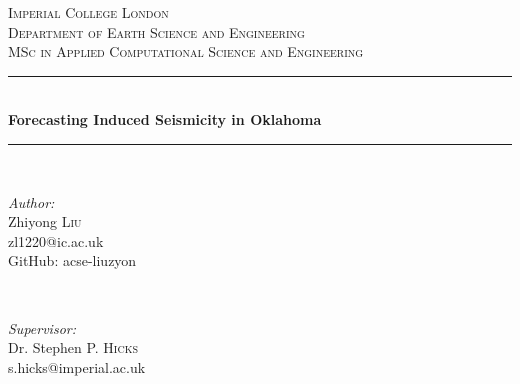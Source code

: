 \documentclass[final-report]{report-template}
\begin{document}
\begin{titlepage}

\newcommand{\HRule}{\rule{\linewidth}{0.5mm}} %

\center %


\textsc{\LARGE Imperial College London}\\[1.5cm] %
\textsc{\Large Department of Earth Science and Engineering}\\[0.5cm] %
\textsc{\large MSc in Applied Computational Science and Engineering}\\[0.5cm] %


\HRule \\[0.4cm]
{ \huge \bfseries Forecasting Induced Seismicity in Oklahoma}\\[0.4cm] %
\HRule \\[1.5cm]

\begin{minipage}{0.4\textwidth}
    \begin{flushleft} \large
    \emph{Author:}\\
    Zhiyong \textsc{Liu}\\ %
    zl1220@ic.ac.uk\\
    GitHub: acse-liuzyon
    \end{flushleft}
    \end{minipage}
    ~
    \begin{minipage}{0.4\textwidth}
    \begin{flushright} \large
    \emph{Supervisor:} \\
    Dr. Stephen P. \textsc{Hicks}\\ %
    s.hicks@imperial.ac.uk
    \end{flushright}
\end{minipage}\\[2cm]


\end{titlepage}
\end{document}
